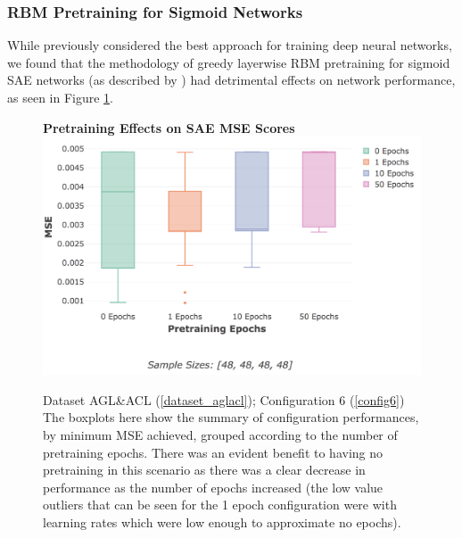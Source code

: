 \documentclass[a4paper,11pt,oneside]{article}
\theoremstyle{plain}
\theoremstyle{definition}
\begin{document}
	\subsubsection{RBM Pretraining for Sigmoid Networks}
	
	While previously considered the best approach for training deep neural networks, we found that the methodology of greedy layerwise RBM pretraining for sigmoid SAE networks (as described by \citet{Hinton2}) had detrimental effects on network performance, as seen in Figure \ref{figure-results-pretraining-effect}. \newline
	
	\begin{figure}[H]
		\centering
		\textbf{Pretraining Effects on SAE MSE Scores} 
		\includegraphics[scale=0.45]{images/results/8_4_weight_init/actual_sigmoid_pt.png}
		\caption[Pretraining Effects on SAE MSE Scores]
		{Dataset AGL\&ACL (\ref{dataset_aglacl}); Configuration 6 (\ref{config6})
			\newline \newline The boxplots here show the summary of configuration performances, by minimum MSE achieved, grouped according to the number of pretraining epochs. There was an evident benefit to having no pretraining in this scenario as there was a clear decrease in performance as the number of epochs increased (the low value outliers that can be seen for the 1 epoch configuration were with learning rates which were low enough to approximate no epochs).}
		\label{figure-results-pretraining-effect}
	\end{figure}		
	
\end{document}

